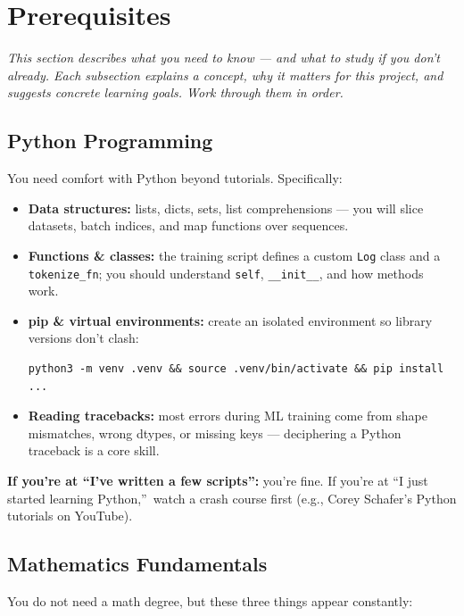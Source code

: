 \section{Prerequisites}

\textit{This section describes what you need to know --- and what to study if you don't already. Each subsection explains a concept, why it matters for this project, and suggests concrete learning goals. Work through them in order.}

\subsection{Python Programming}

You need comfort with Python beyond tutorials. Specifically:

\begin{itemize}[nosep]
    \item \textbf{Data structures:} lists, dicts, sets, list comprehensions --- you will slice datasets, batch indices, and map functions over sequences.
    \item \textbf{Functions \& classes:} the training script defines a custom \texttt{Log} class and a \texttt{tokenize\_fn}; you should understand \texttt{self}, \texttt{\_\_init\_\_}, and how methods work.
    \item \textbf{pip \& virtual environments:} create an isolated environment so library versions don't clash:
\begin{verbatim}
python3 -m venv .venv && source .venv/bin/activate && pip install ...
\end{verbatim}
    \item \textbf{Reading tracebacks:} most errors during ML training come from shape mismatches, wrong dtypes, or missing keys --- deciphering a Python traceback is a core skill.
\end{itemize}

\textbf{If you're at ``I've written a few scripts'':} you're fine. If you're at ``I just started learning Python,''\ watch a crash course first (e.g., Corey Schafer's Python tutorials on YouTube).

\subsection{Mathematics Fundamentals}

You do not need a math degree, but these three things appear constantly:

